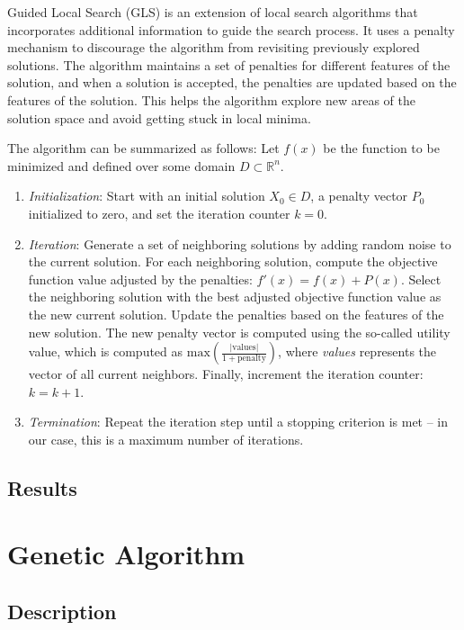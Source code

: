 \documentclass{article}
\begin{document}
Guided Local Search (GLS) is an extension of local search algorithms
that incorporates additional information to guide the search process.
It uses a penalty mechanism to discourage the algorithm from revisiting
previously explored solutions. The algorithm maintains a set of
penalties for different features of the solution, and when a solution is
accepted, the penalties are updated based on the features of the
solution. This helps the algorithm explore new areas of the solution
space and avoid getting stuck in local minima.

The algorithm can be summarized as follows:
Let $f(x)$ be the function to be minimized and defined over some domain
$D \subset \mathbb{R}^n$.

\begin{enumerate}
  \item \textit{Initialization}: Start with an initial solution $X_0
    \in D$, a penalty vector $P_0$ initialized to zero, and set the
    iteration counter $k = 0$.
  \item \textit{Iteration}: Generate a set of neighboring solutions
    by adding random noise to the current solution. For each
    neighboring solution, compute the objective function value
    adjusted by the penalties: $f'(x) = f(x) + P(x)$. Select the
    neighboring solution with the best adjusted objective function
    value as the new current solution. Update the penalties based on
    the features of the new solution. The new penalty vector is
    computed using the so-called utility value, which is computed as
    $\text{max}\left( \frac{|\text{values}|}{1 + \text{penalty}}
    \right)$, where \textit{values} represents the vector of all
    current neighbors. Finally, increment the iteration counter: $k = k + 1$.
  \item \textit{Termination}: Repeat the iteration step until a
    stopping criterion is met -- in our case, this is a maximum
    number of iterations.
\end{enumerate}

\subsection{Results}

\section{Genetic Algorithm}

\subsection{Description}
\end{document}
